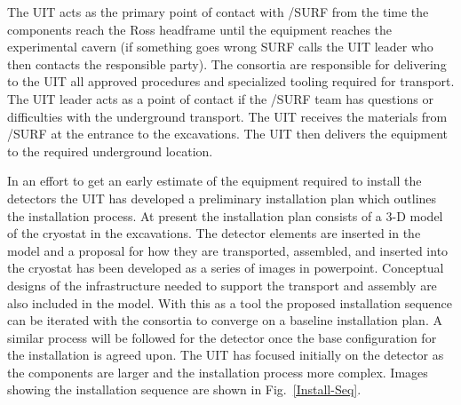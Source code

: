 The UIT acts as the primary point of contact with /SURF
from the time the components reach the Ross headframe until the
equipment reaches the experimental cavern (if something goes wrong
SURF calls the UIT leader who then contacts the responsible
party). The consortia are responsible for delivering to the UIT all
approved procedures and specialized tooling required for
transport. The UIT leader acts as a point of contact if the
/SURF team has questions or difficulties with the
underground transport.  The UIT receives the materials from
/SURF at the entrance to the  excavations. The
UIT then delivers the equipment to the required underground location.

In an effort to get an early estimate of the equipment required to
install the detectors the UIT has developed a preliminary installation
plan which outlines the installation process. At present the
installation plan consists of a 3-D model of the cryostat in the
excavations. The  detector elements are inserted in the
model and a proposal for how they are transported, assembled, and
inserted into the cryostat has been developed as a series of images in
powerpoint. Conceptual designs of the infrastructure needed to support
the transport and assembly are also included in the model. With this
as a tool the proposed installation sequence can be iterated with the
consortia to converge on a baseline installation plan. A similar
process will be followed for the  detector once the base
configuration for the  installation is agreed upon. The UIT
has focused initially on the  detector as the 
components are larger and the installation process more
complex. Images showing the  installation sequence are shown
in Fig.~\ref{Install-Seq}.
